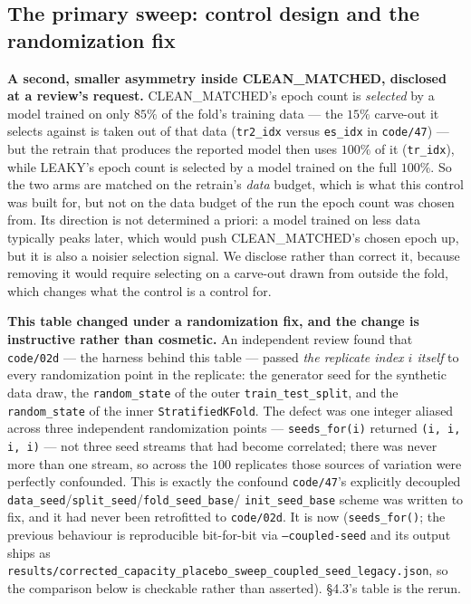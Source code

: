 \documentclass[10pt]{article} %
\begin{document}
\subsection{The primary sweep: control design and the randomization fix}

\textbf{A second, smaller asymmetry inside CLEAN\_MATCHED, disclosed at a review's request.} CLEAN\_MATCHED's epoch count is \emph{selected} by a model
trained on only $85\%$ of the fold's training data --- the $15\%$ carve-out it
selects against is taken out of that data (\texttt{tr2\_idx} versus
\texttt{es\_idx} in \texttt{code/47}) --- but the retrain that produces the
reported model then uses $100\%$ of it (\texttt{tr\_idx}), while LEAKY's epoch
count is selected by a model trained on the full $100\%$. So the two arms are
matched on the retrain's \emph{data} budget, which is what this control was
built for, but not on the data budget of the run the epoch count was chosen
from. Its direction is not determined a priori: a model trained on less data
typically peaks later, which would push CLEAN\_MATCHED's chosen epoch up, but
it is also a noisier selection signal. We disclose rather than correct it,
because removing it would require selecting on a carve-out drawn from outside
the fold, which changes what the control is a control for.

\textbf{This table changed under a randomization fix, and the change is
instructive rather than cosmetic.} An independent review found that
\texttt{code/02d} --- the harness behind this table --- passed \emph{the
replicate index $i$ itself} to every randomization point in the replicate: the
generator seed for the synthetic data draw, the \texttt{random\_state} of the
outer \texttt{train\_test\_split}, and the \texttt{random\_state} of the inner
\texttt{StratifiedKFold}. The defect was one integer aliased across three
independent randomization points --- \texttt{seeds\_for(i)} returned
\texttt{(i, i, i, i)} --- not three seed streams that had become correlated;
there was never more than one stream, so across the $100$ replicates those
sources of variation were perfectly confounded. This is exactly the confound
\texttt{code/47}'s explicitly decoupled
\texttt{data\_seed}/\texttt{split\_seed}/\texttt{fold\_seed\_base}/
\texttt{init\_seed\_base} scheme was written to fix, and it had never been
retrofitted to \texttt{code/02d}. It is now (\texttt{seeds\_for()}; the
previous behaviour is reproducible bit-for-bit via \texttt{--coupled-seed} and
its output ships as
\texttt{results/corrected\_capacity\_placebo\_sweep\_coupled\_seed\_legacy.json},
so the comparison below is checkable rather than asserted). §4.3's table is the rerun.
\end{document}
